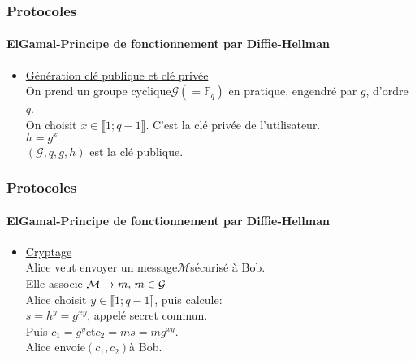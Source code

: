 \documentclass[10pt]{beamer}
\begin{document}
\begin{frame}
\frametitle{Protocoles}
\framesubtitle{ElGamal-Principe de fonctionnement par Diffie-Hellman}
\begin{itemize}
\item \underline{Génération clé publique et clé privée}\\
On prend un groupe cyclique\hspace{0.05cm}$\mathcal{G}\left(=\mathbb{F}_q\right)$\hspace{0.05cm} en pratique, engendré par \hspace{0.05cm}$g$, d'ordre \hspace{0.05cm}$q$.\\
On choisit \hspace{0.05cm}$x \in \llbracket1;q-1 \rrbracket$. C'est la clé privée de l'utilisateur.\\
$h=g^{x}$\\
$\left(\mathcal{G},q,g,h\right)$\hspace{0.05cm} est la clé publique.
\end{itemize}
\end{frame}

\begin{frame}
\frametitle{Protocoles}
\framesubtitle{ElGamal-Principe de fonctionnement par Diffie-Hellman}
\begin{itemize}
\item \underline{Cryptage}\\
Alice veut envoyer un message\hspace{0.05cm}$\mathcal{M}$\hspace{0.05cm}sécurisé à Bob.\\
Elle associe $\mathcal{M}\rightarrow m,\hspace{0.05cm}m \in \mathcal{G}$\\
Alice choisit \hspace{0.05cm}$y \in \llbracket1;q-1 \rrbracket$, puis calcule:\\
$s=h^{y}=g^{xy}$, appelé secret commun.\\
Puis \hspace{0.05cm}$c_1=g^{y}$\hspace{0.05cm}et\hspace{0.05cm}$c_2=ms=mg^{xy}$.\\
Alice envoie\hspace{0.05cm}$(c_1,c_2)$\hspace{0.05cm}à Bob.
\end{itemize}
\end{frame}
\end{document}
